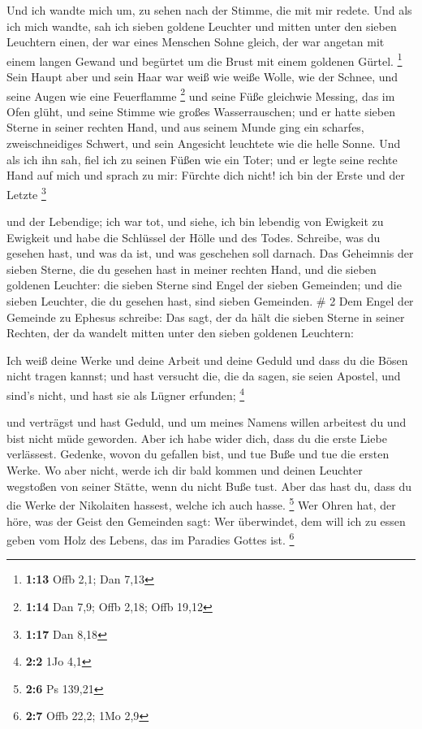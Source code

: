  Und ich wandte mich um, zu sehen nach der Stimme, die mit
mir redete. Und als ich mich wandte, sah ich sieben goldene Leuchter
 und mitten unter den sieben Leuchtern einen, der war eines
Menschen Sohne gleich, der war angetan mit einem langen Gewand und
begürtet um die Brust mit einem goldenen Gürtel. \footnote{\textbf{1:13}
  Offb 2,1; Dan 7,13}  Sein Haupt aber und sein Haar war
weiß wie weiße Wolle, wie der Schnee, und seine Augen wie eine
Feuerflamme \footnote{\textbf{1:14} Dan 7,9; Offb 2,18; Offb 19,12}
 und seine Füße gleichwie Messing, das im Ofen glüht, und
seine Stimme wie großes Wasserrauschen;  und er hatte
sieben Sterne in seiner rechten Hand, und aus seinem Munde ging ein
scharfes, zweischneidiges Schwert, und sein Angesicht leuchtete wie die
helle Sonne.  Und als ich ihn sah, fiel ich zu seinen Füßen
wie ein Toter; und er legte seine rechte Hand auf mich und sprach zu
mir: Fürchte dich nicht! ich bin der Erste und der Letzte \footnote{\textbf{1:17}
  Dan 8,18}

 und der Lebendige; ich war tot, und siehe, ich bin
lebendig von Ewigkeit zu Ewigkeit und habe die Schlüssel der Hölle und
des Todes.  Schreibe, was du gesehen hast, und was da ist,
und was geschehen soll darnach.  Das Geheimnis der sieben
Sterne, die du gesehen hast in meiner rechten Hand, und die sieben
goldenen Leuchter: die sieben Sterne sind Engel der sieben Gemeinden;
und die sieben Leuchter, die du gesehen hast, sind sieben Gemeinden. \#
2  Dem Engel der Gemeinde zu Ephesus schreibe: Das sagt, der
da hält die sieben Sterne in seiner Rechten, der da wandelt mitten unter
den sieben goldenen Leuchtern:

 Ich weiß deine Werke und deine Arbeit und deine Geduld und
dass du die Bösen nicht tragen kannst; und hast versucht die, die da
sagen, sie seien Apostel, und sind's nicht, und hast sie als Lügner
erfunden; \footnote{\textbf{2:2} 1Jo 4,1}

 und verträgst und hast Geduld, und um meines Namens willen
arbeitest du und bist nicht müde geworden.  Aber ich habe
wider dich, dass du die erste Liebe verlässest.  Gedenke,
wovon du gefallen bist, und tue Buße und tue die ersten Werke. Wo aber
nicht, werde ich dir bald kommen und deinen Leuchter wegstoßen von
seiner Stätte, wenn du nicht Buße tust.  Aber das hast du,
dass du die Werke der Nikolaiten hassest, welche ich auch hasse.
\footnote{\textbf{2:6} Ps 139,21}  Wer Ohren hat, der höre,
was der Geist den Gemeinden sagt: Wer überwindet, dem will ich zu essen
geben vom Holz des Lebens, das im Paradies Gottes ist. \footnote{\textbf{2:7}
  Offb 22,2; 1Mo 2,9}

